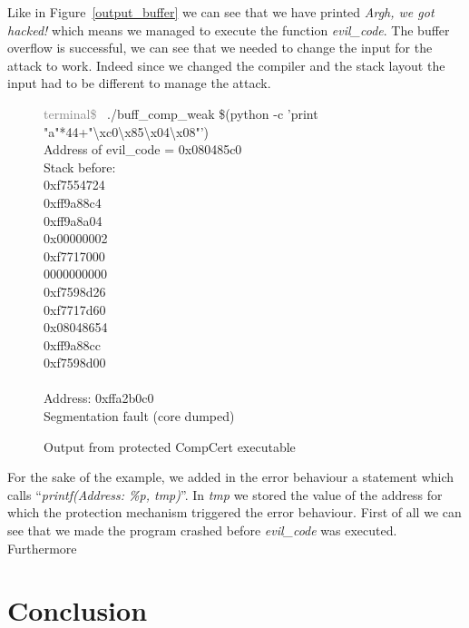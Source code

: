 \documentclass[11pt]{sdm}
\begin{document}
Like in Figure~\ref{output_buffer} we can see that we have printed \textit{Argh, we got hacked!} which means we managed to execute the function \textit{evil\_code}. The buffer overflow is successful, we can see that we needed to change the input for the attack to work. Indeed since we changed the compiler and the stack layout the input had to be different to manage the attack. 

\begin{figure}[!ht]
\textcolor{gray}{terminal\$~} ./buff\_comp\_weak \$(python -c 'print "a"*44+"\textbackslash{xc0}\textbackslash{x85}\textbackslash{x04}\textbackslash{x08}"')\\
Address of evil\_code = 0x080485c0\\

Stack before:       \\
0xf7554724          \\
0xff9a88c4          \\
0xff9a8a04          \\
0x00000002          \\
0xf7717000          \\
0000000000          \\
0xf7598d26          \\
0xf7717d60          \\
0x08048654          \\
0xff9a88cc          \\
0xf7598d00          \\
                    \\
Address: 0xffa2b0c0 \\
Segmentation fault (core dumped)
\caption{Output from protected CompCert executable}
\label{output_protected}
\end{figure}

For the sake of the example, we added in the error behaviour a statement which calls  ``\textit{printf(Address: \%p, tmp)}''. In \textit{tmp} we stored the value of the address for which the protection mechanism triggered the error behaviour.
First of all we can see that we made the program crashed before \textit{evil\_code} was executed. Furthermore 


\section{Conclusion}
\label{sec:Conclusion}
\end{document}
